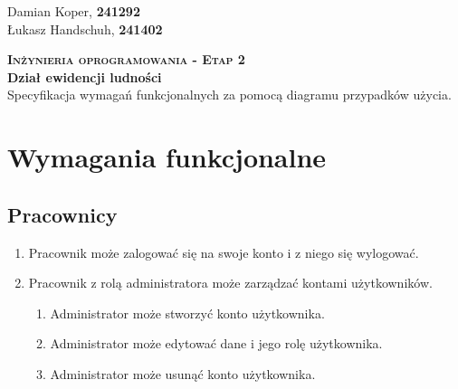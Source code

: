 \documentclass[12pt]{article}
\begin{document}
\begin{flushleft}
        Damian Koper, \textbf{241292} \\
        Łukasz Handschuh, \textbf{241402}
\end{flushleft}
\vspace{1cm}
{
    \centering
    {\Huge\scshape\bfseries Inżynieria oprogramowania - Etap 2 }\\
    \vspace{0.25cm}
    \Large\textbf{Dział ewidencji ludności} \\
    \vspace{0.25cm}
    \large Specyfikacja wymagań funkcjonalnych za pomocą diagramu
    przypadków użycia.\\
}

\section{Wymagania funkcjonalne}

\subsection{Pracownicy}
\begin{enumerate}
    \item Pracownik może zalogować się na swoje konto i z niego się wylogować.
    \item Pracownik z rolą administratora może zarządzać kontami użytkowników.
    \begin{enumerate}
        \item Administrator może stworzyć konto użytkownika.
        \item Administrator może edytować dane i jego rolę użytkownika.
        \item Administrator może usunąć konto użytkownika.
    \end{enumerate}
\end{enumerate}
\end{document}

